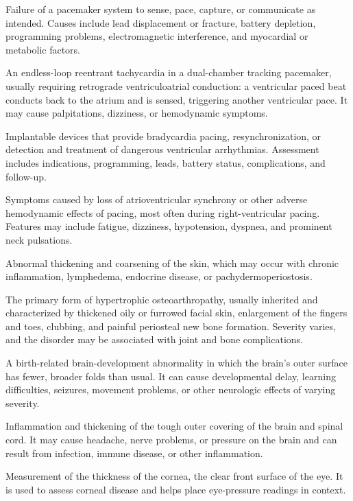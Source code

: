  Failure of a pacemaker system to sense, pace, capture, or communicate as intended. Causes include lead displacement or fracture, battery depletion, programming problems, electromagnetic interference, and myocardial or metabolic factors.

 An endless-loop reentrant tachycardia in a dual-chamber tracking pacemaker, usually requiring retrograde ventriculoatrial conduction: a ventricular paced beat conducts back to the atrium and is sensed, triggering another ventricular pace. It may cause palpitations, dizziness, or hemodynamic symptoms.

 Implantable devices that provide bradycardia pacing, resynchronization, or detection and treatment of dangerous ventricular arrhythmias. Assessment includes indications, programming, leads, battery status, complications, and follow-up.

 Symptoms caused by loss of atrioventricular synchrony or other adverse hemodynamic effects of pacing, most often during right-ventricular pacing. Features may include fatigue, dizziness, hypotension, dyspnea, and prominent neck pulsations.

 Abnormal thickening and coarsening of the skin, which may occur with chronic inflammation, lymphedema, endocrine disease, or pachydermoperiostosis.

 The primary form of hypertrophic osteoarthropathy, usually inherited and characterized by thickened oily or furrowed facial skin, enlargement of the fingers and toes, clubbing, and painful periosteal new bone formation. Severity varies, and the disorder may be associated with joint and bone complications.

 A birth-related brain-development abnormality in which the brain’s outer surface has fewer, broader folds than usual. It can cause developmental delay, learning difficulties, seizures, movement problems, or other neurologic effects of varying severity.

 Inflammation and thickening of the tough outer covering of the brain and spinal cord. It may cause headache, nerve problems, or pressure on the brain and can result from infection, immune disease, or other inflammation.

 Measurement of the thickness of the cornea, the clear front surface of the eye. It is used to assess corneal disease and helps place eye-pressure readings in context.

